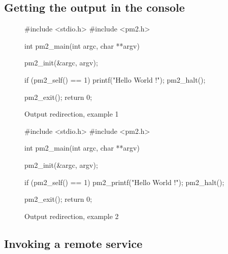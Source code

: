 \documentclass[a4paper,11pt]{article}
\begin{document}
\subsection{Getting the output in the console}
\begin{figure}
\begin{center}
\begin{boxedminipage}{0.8\textwidth}
\begin{footnotesize}
\begin{listing}{0}
 #include <stdio.h>
 #include <pm2.h>

 int pm2_main(int argc, char **argv)
 {
   pm2_init(&argc, argv);

   if (pm2_self() == 1)
     {
       printf("Hello World !\n");    
       pm2_halt();
     }
  
   pm2_exit();
   return 0;
 }
\end{listing}
\end{footnotesize}
\end{boxedminipage}
\end{center}
\caption{Output redirection, example 1\label{fig:ex2-1}}
\end{figure}
\begin{figure}
\begin{center}
\begin{boxedminipage}{0.8\textwidth}
\begin{footnotesize}
\begin{listing}{0}
 #include <stdio.h>
 #include <pm2.h>

 int pm2_main(int argc, char **argv)
 {
   pm2_init(&argc, argv);

   if (pm2_self() == 1)
     {
       pm2_printf("Hello World !\n");    
       pm2_halt();
     }
  
   pm2_exit();
   return 0;
 }
\end{listing}
\end{footnotesize}
\end{boxedminipage}
\end{center}
\caption{Output redirection, example 2\label{fig:ex2-2}}
\end{figure}

\subsection{Invoking a remote service}
\end{document}
